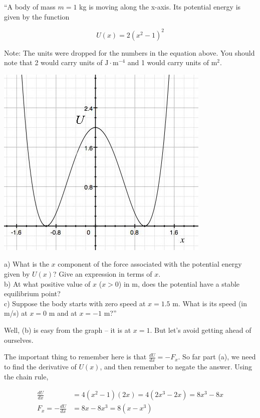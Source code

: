 \documentclass[12pt,a4paper]{report}
\begin{document}
``A body of mass $m = 1$ kg is moving along the x-axis. Its potential energy is given by the function

\begin{equation*}
U(x) = 2 (x^2 - 1)^2
\end{equation*}

Note: The units were dropped for the numbers in the equation above. You should note that 2 would carry units of $\text{J} \cdot \text{m}^{-4}$ and 1 would carry units of $\text{m}^2$.

\begin{center}
\includegraphics[scale=0.75]{Graphics/h5p6}
\end{center}

a) What is the $x$ component of the force associated with the potential energy given by $U(x)$? Give an expression in terms of $x$.\\
b) At what positive value of $x$ ($x > 0$) in m, does the potential have a stable equilibrium point?\\
c) Suppose the body starts with zero speed at $x = 1.5$ m. What is its speed (in m/s) at $x = 0$ m and at $x = -1$ m?''

Well, (b) is easy from the graph -- it is at $x = 1$. But let's avoid getting ahead of ourselves.

The important thing to remember here is that $\displaystyle \frac{dU}{dx} = - F_x$. So far part (a), we need to find the derivative of $U(x)$, and then remember to negate the answer. Using the chain rule,

\begin{align}
\frac{dU}{dx} &= 4(x^2 - 1)(2x) = 4(2x^3 - 2x) = 8x^3 - 8x\\
F_x = - \frac{dU}{dx} &= 8x - 8x^3 = 8(x - x^3)
\end{align}
\end{document}
